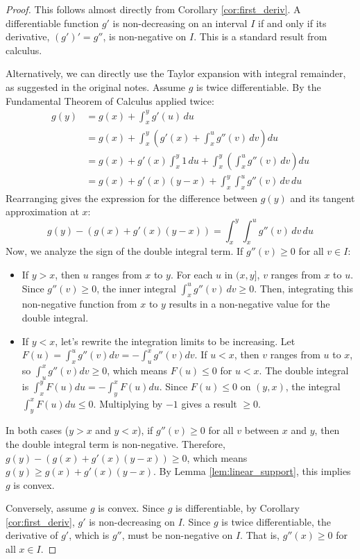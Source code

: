 \documentclass[11pt]{article}
\theoremstyle{definition}
\theoremstyle{remark}
\begin{document}
\begin{proof}
This follows almost directly from Corollary \ref{cor:first_deriv}. A differentiable function $g'$ is non-decreasing on an interval $I$ if and only if its derivative, $(g')' = g''$, is non-negative on $I$. This is a standard result from calculus.

Alternatively, we can directly use the Taylor expansion with integral remainder, as suggested in the original notes. Assume $g$ is twice differentiable. By the Fundamental Theorem of Calculus applied twice:
\begin{align*}
g(y) &= g(x) + \int_{x}^{y} g'(u) \, du \\
&= g(x) + \int_{x}^{y} \left( g'(x) + \int_{x}^{u} g''(v) \, dv \right) du \\
&= g(x) + g'(x) \int_{x}^{y} 1 \, du + \int_{x}^{y} \left( \int_{x}^{u} g''(v) \, dv \right) du \\
&= g(x) + g'(x)(y-x) + \int_{x}^{y} \int_{x}^{u} g''(v) \, dv \, du
\end{align*}
Rearranging gives the expression for the difference between $g(y)$ and its tangent approximation at $x$:
\[
g(y) - \left( g(x) + g'(x)(y-x) \right) = \int_{x}^{y} \int_{x}^{u} g''(v) \, dv \, du
\]
Now, we analyze the sign of the double integral term.
If $g''(v) \ge 0$ for all $v \in I$:
\begin{itemize}
    \item If $y > x$, then $u$ ranges from $x$ to $y$. For each $u$ in $(x, y]$, $v$ ranges from $x$ to $u$. Since $g''(v) \ge 0$, the inner integral $\int_{x}^{u} g''(v) \, dv \ge 0$. Then, integrating this non-negative function from $x$ to $y$ results in a non-negative value for the double integral.
    \item If $y < x$, let's rewrite the integration limits to be increasing. Let $F(u) = \int_{x}^{u} g''(v) dv = - \int_{u}^{x} g''(v) dv$. If $u < x$, then $v$ ranges from $u$ to $x$, so $\int_{u}^{x} g''(v) dv \ge 0$, which means $F(u) \le 0$ for $u < x$. The double integral is $\int_{x}^{y} F(u) du = -\int_{y}^{x} F(u) du$. Since $F(u) \le 0$ on $(y, x)$, the integral $\int_{y}^{x} F(u) du \le 0$. Multiplying by $-1$ gives a result $\ge 0$.
\end{itemize}
In both cases ($y>x$ and $y<x$), if $g''(v) \ge 0$ for all $v$ between $x$ and $y$, then the double integral term is non-negative.
Therefore, $g(y) - ( g(x) + g'(x)(y-x) ) \ge 0$, which means $g(y) \ge g(x) + g'(x)(y-x)$. By Lemma \ref{lem:linear_support}, this implies $g$ is convex.

Conversely, assume $g$ is convex. Since $g$ is differentiable, by Corollary \ref{cor:first_deriv}, $g'$ is non-decreasing on $I$. Since $g$ is twice differentiable, the derivative of $g'$, which is $g''$, must be non-negative on $I$. That is, $g''(x) \ge 0$ for all $x \in I$.
\end{proof}
\end{document}
